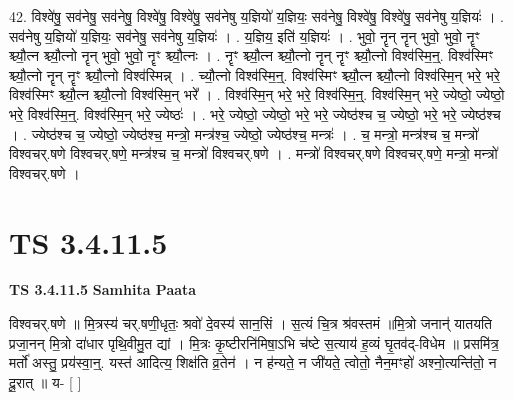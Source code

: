 \documentclass[17pt]{extarticle}
\begin{document}
42. विश्वे॑षु॒ सव॑नेषु॒ सव॑नेषु॒ विश्वे॑षु॒ विश्वे॑षु॒ सव॑नेषु य॒ज्ञियो॑ य॒ज्ञियः॒ सव॑नेषु॒ विश्वे॑षु॒ विश्वे॑षु॒ सव॑नेषु य॒ज्ञियः॑ । . सव॑नेषु य॒ज्ञियो॑ य॒ज्ञियः॒ सव॑नेषु॒ सव॑नेषु य॒ज्ञियः॑ । . य॒ज्ञिय॒ इति॑ य॒ज्ञियः॑ । . भुवो॒ नॄन् नॄन् भुवो॒ भुवो॒ नॄꣳ श्च्यौ॒त्न श्च्यौ॒त्नो नॄन् भुवो॒ भुवो॒ नॄꣳ श्च्यौ॒त्नः । . नॄꣳ श्च्यौ॒त्न श्च्यौ॒त्नो नॄन् नॄꣳ श्च्यौ॒त्नो विश्व॑स्मि॒न्॒. विश्व॑स्मिꣳ श्च्यौ॒त्नो नॄन् नॄꣳ श्च्यौ॒त्नो विश्व॑स्मिन्न् । . च्यौ॒त्नो विश्व॑स्मि॒न्॒. विश्व॑स्मिꣳ श्च्यौ॒त्न श्च्यौ॒त्नो विश्व॑स्मि॒न् भरे॒ भरे॒ विश्व॑स्मिꣳ श्च्यौ॒त्न श्च्यौ॒त्नो विश्व॑स्मि॒न् भरे᳚ । . विश्व॑स्मि॒न् भरे॒ भरे॒ विश्व॑स्मि॒न्॒. विश्व॑स्मि॒न् भरे॒ ज्येष्ठो॒ ज्येष्ठो॒ भरे॒ विश्व॑स्मि॒न्॒. विश्व॑स्मि॒न् भरे॒ ज्येष्ठः॑ । . भरे॒ ज्येष्ठो॒ ज्येष्ठो॒ भरे॒ भरे॒ ज्येष्ठ॑श्च च॒ ज्येष्ठो॒ भरे॒ भरे॒ ज्येष्ठ॑श्च । . ज्येष्ठ॑श्च च॒ ज्येष्ठो॒ ज्येष्ठ॑श्च॒ मन्त्रो॒ मन्त्र॑श्च॒ ज्येष्ठो॒ ज्येष्ठ॑श्च॒ मन्त्रः॑ । . च॒ मन्त्रो॒ मन्त्र॑श्च च॒ मन्त्रो॑ विश्वचर्.षणे विश्वचर्.षणे॒ मन्त्र॑श्च च॒ मन्त्रो॑ विश्वचर्.षणे । . मन्त्रो॑ विश्वचर्.षणे विश्वचर्.षणे॒ मन्त्रो॒ मन्त्रो॑ विश्वचर्.षणे । \newline
\pagebreak
{}

\section{ TS 3.4.11.5 }

\textbf{TS 3.4.11.5 } \newline
\textbf{Samhita Paata} \newline

विश्वचर्.षणे ॥ मि॒त्रस्य॑ चर्.षणी॒धृतः॒ श्रवो॑ दे॒वस्य॑ सान॒सिं । स॒त्यं चि॒त्र श्र॑वस्तमं ॥मि॒त्रो जनान्॑ यातयति प्रजा॒नन् मि॒त्रो दा॑धार पृथि॒वीमु॒त द्यां । मि॒त्रः कृ॒ष्टीरनि॑मिषा॒ऽभि च॑ष्टे स॒त्याय॑ ह॒व्यं घृ॒तव॑द्-विधेम ॥ प्रसमि॑त्र॒ मर्तो॑ अस्तु॒ प्रय॑स्वा॒न्॒. यस्त॑ आदित्य॒ शिक्ष॑ति व्र॒तेन॑ । न ह॑न्यते॒ न जी॑यते॒ त्वोतो॒ नैन॒मꣳहो॑ अश्नो॒त्यन्ति॑तो॒ न दू॒रात् ॥ य- [  ] \newline
\end{document}
